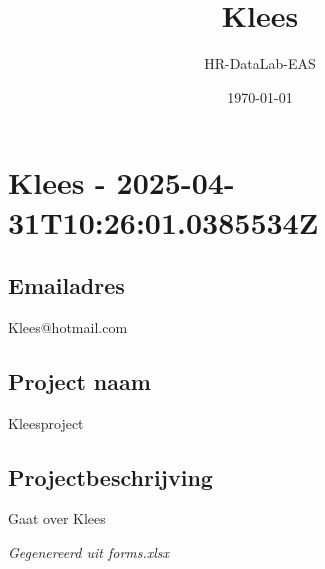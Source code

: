 \documentclass[a4paper,11pt]{article}
\title{Klees}
\author{HR-DataLab-EAS}
\date{\today}
\begin{document}
\maketitle

\section*{Klees - 2025-04-31T10:26:01.0385534Z}
\hrulefill


\subsection*{Emailadres}
Klees@hotmail.com


\subsection*{Project naam}
Kleesproject


\subsection*{Projectbeschrijving}
Gaat over Klees


\hrulefill

\textit{Gegenereerd uit forms.xlsx}
\end{document}
